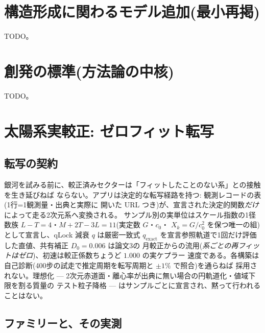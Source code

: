 \documentclass[a4paper,10pt,twocolumn]{ltjsarticle}
\begin{document}
\section{構造形成に関わるモデル追加(最小再掲)}
TODO。

\section{創発の標準(方法論の中核)}
TODO。

\section{太陽系実較正: ゼロフィット転写}

\subsection{転写の契約}

銀河を試みる前に、較正済みセクターは「フィットしたことのない系」との接触を生き延びねば
ならない。アプリは決定的な転写経路を持つ: 観測レコードの表(1行=1観測量・出典と実際に
開いた URL つき)が、宣言された決定的関数\emph{だけ}によって走る2次元系へ変換される。
サンプル別の実単位はスケール指数の1径数族 $L-T=4$・$M+2T-3L=11$(実定数 $G$・$c_0$・
$X_k=G/c_0^2$ を保つ唯一の組)として宣言し、qLock 減衰 $q$ は厳密一致式
$q_{\mathrm{exact}}$ を宣言参照軌道で1回だけ評価した直値、共有補正 $D_0=0.006$ は論文3の
月較正からの流用(\emph{系ごとの再フィットはゼロ})、初速は較正係数ちょうど $1.000$ の実ケプラー
速度である。各構築は自己診断(400步の試走で推定周期を転写周期と $\pm1\%$ で照合)を通らねば
採用されない。理想化 — 2次元赤道面・離心率が出典に無い場合の円軌道化・値域下限を割る質量の
テスト粒子降格 — はサンプルごとに宣言され、黙って行われることはない。

\subsection{ファミリーと、その実測}
\end{document}
